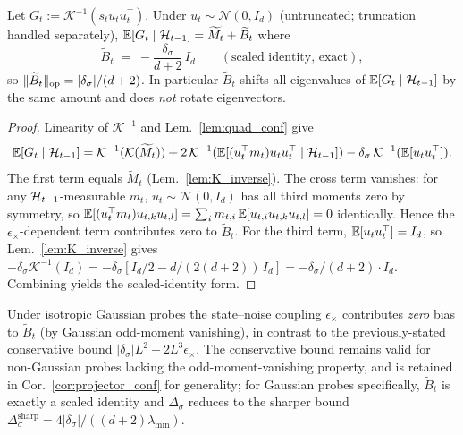 \begin{lemma}
\label{lem:G_unbiased_conf}
Let $G_t := \mathcal K^{-1}(s_t u_tu_t^\top)$. Under $u_t\sim\mathcal N(0,I_d)$
(untruncated; truncation handled separately),
$\mathbb{E}[G_t\mid\mathcal{H}_{t-1}] = \widetilde M_t + \widetilde B_t$ where
\[
\widetilde B_t \;=\; -\frac{\delta_\sigma}{d+2}\,I_d \qquad(\text{scaled identity, exact}),
\]
so $\|\widetilde B_t\|_{\mathrm{op}} = |\delta_\sigma|/(d+2)$. In particular
$\widetilde B_t$ shifts all eigenvalues of $\mathbb{E}[G_t\mid\mathcal{H}_{t-1}]$ by
the same amount and does \emph{not} rotate eigenvectors.
\end{lemma}
\begin{proof}
Linearity of $\mathcal K^{-1}$ and Lem.~\ref{lem:quad_conf} give
\[
\mathbb{E}[G_t\mid\mathcal{H}_{t-1}]
= \mathcal K^{-1}(\mathcal K(\widetilde M_t))
+ 2\,\mathcal K^{-1}(\mathbb{E}[(u_t^\top m_t)u_tu_t^\top\mid\mathcal{H}_{t-1}])
- \delta_\sigma\,\mathcal K^{-1}(\mathbb{E}[u_tu_t^\top]).
\]
The first term equals $\widetilde M_t$ (Lem.~\ref{lem:K_inverse}).
The cross term vanishes: for any $\mathcal{H}_{t-1}$-measurable $m_t$,
$u_t\sim\mathcal N(0,I_d)$ has all third moments zero by symmetry, so
$\mathbb{E}[(u_t^\top m_t)u_{t,k}u_{t,l}]=\sum_i m_{t,i}\,\mathbb{E}[u_{t,i}u_{t,k}u_{t,l}]=0$
identically. Hence the $\epsilon_\times$-dependent term contributes
zero to $\widetilde B_t$. For the third term, $\mathbb{E}[u_tu_t^\top]=I_d$,
so Lem.~\ref{lem:K_inverse} gives
$-\delta_\sigma\mathcal K^{-1}(I_d) = -\delta_\sigma[I_d/2 - d/(2(d+2))\,I_d]
= -\delta_\sigma/(d+2)\cdot I_d$. Combining yields the scaled-identity form.
\end{proof}

\begin{remark}
\label{rem:bias_floor_sharp}
Under isotropic Gaussian probes the state--noise coupling
$\epsilon_\times$ contributes \emph{zero} bias to $\widetilde B_t$ (by
Gaussian odd-moment vanishing), in contrast to the previously-stated
conservative bound $|\delta_\sigma|L^2 + 2L^3\epsilon_\times$. The
conservative bound remains valid for non-Gaussian probes lacking the
odd-moment-vanishing property, and is retained in
Cor.~\ref{cor:projector_conf} for generality; for Gaussian probes
specifically, $\widetilde B_t$ is exactly a scaled identity and
$\Delta_\sigma$ reduces to the sharper bound
$\Delta_\sigma^{\mathrm{sharp}} = 4|\delta_\sigma|/((d+2)\lambda_{\min})$.
\end{remark}

